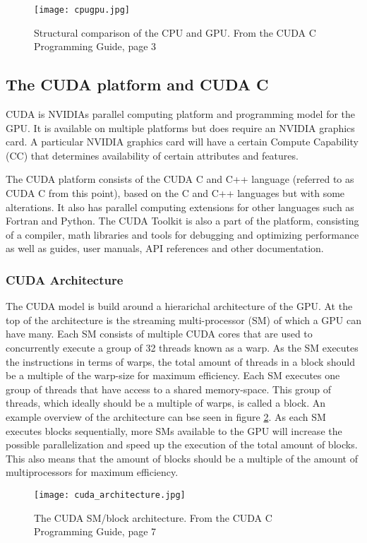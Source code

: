 \begin{figure}[h!]
\texttt{[image: cpugpu.jpg]}
\caption{Structural comparison of the CPU and GPU. From the CUDA C Programming Guide, page 3 \cite{nvidia2014programming}\label{cpugpu}}
\end{figure}

\subsection{The CUDA platform and CUDA C}
CUDA is NVIDIAs parallel computing platform and programming model for the GPU.
It is available on multiple platforms but does require an NVIDIA graphics card. 
A particular NVIDIA graphics card will have a certain Compute Capability (CC) that determines availability of certain attributes and features.

The CUDA platform consists of the CUDA C and C++ language (referred to as CUDA C from this point), based on the C and C++ languages but with some alterations.
It also has parallel computing extensions for other languages such as Fortran and Python.
The CUDA Toolkit is also a part of the platform, consisting of a compiler, math libraries and tools for debugging and optimizing performance as well as guides, user manuals, API references and other documentation.

\subsubsection{CUDA Architecture}
The CUDA model is build around a hierarichal architecture of the GPU. 
At the top of the architecture is the streaming multi-processor (SM) of which a GPU can have many. 
Each SM consists of multiple CUDA cores that are used to concurrently execute a group of 32 threads known as a warp. 
As the SM executes the instructions in terms of warps, the total amount of threads in a block should be a multiple of the warp-size for maximum efficiency.
Each SM executes one group of threads that have access to a shared memory-space.
This group of threads, which ideally should be a multiple of warps, is called a block. 
An example overview of the architecture can bse seen in figure \ref{cuda_architecture}.
As each SM executes blocks sequentially, more SMs available to the GPU will increase the possible parallelization and speed up the execution of the total amount of blocks. 
This also means that the amount of blocks should be a multiple of the amount of multiprocessors for maximum efficiency.

\begin{figure}[h!]\centering
\texttt{[image: cuda\_architecture.jpg]}
\caption{The CUDA SM/block architecture. From the CUDA C Programming Guide, page 7 \cite{nvidia2014programming}\label{cuda_architecture}}
\end{figure}

